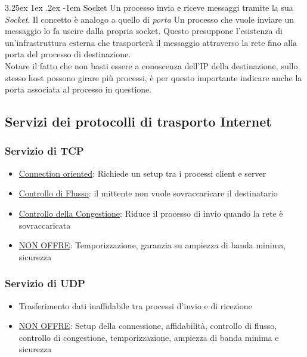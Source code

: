 \documentclass{article}
\makeatletter
\renewcommand\paragraph{\@startsection{paragraph}{5}{\z@}%
  {3.25ex \@plus1ex \@minus.2ex}%
  {-1em}%
  {\normalfont\normalsize\bfseries}}
\makeatother
\begin{document}
            \paragraph{Socket} Un processo invia e riceve messaggi tramite la sua \textit{Socket}. Il concetto è analogo a quello di \textit{porta}
            Un processo che vuole inviare un messaggio lo fa uscire dalla propria socket. Questo presuppone l'esistenza di un'infrastruttura esterna che trasporterà il messaggio attraverso la rete fino alla porta del processo di destinazione.\\
            Notare il fatto che non basti essere a conoscenza dell'IP della destinazione, sullo stesso host possono girare più processi, è per questo importante indicare anche la porta associata al processo in questione.

        \subsection{Servizi dei protocolli di trasporto Internet}
            \subsubsection{Servizio di TCP}
                \begin{itemize}
                    \item \underline{Connection oriented}: Richiede un setup tra i processi client e server
                    \item \underline{Controllo di Flusso}: il mittente non vuole sovraccaricare il destinatario
                    \item \underline{Controllo della Congestione}: Riduce il processo di invio quando la rete è sovraccaricata
                    \item \underline{NON OFFRE}: Temporizzazione, garanzia su ampiezza di banda minima, sicurezza 
                \end{itemize}

            \subsubsection{Servizio di UDP}
                \begin{itemize}
                    \item Trasferimento dati inaffidabile tra processi d'invio e di ricezione
                    \item \underline{NON OFFRE}: Setup della connessione, affidabilità, controllo di flusso, controllo di congestione, temporizzazione, ampiezza di banda minima e sicurezza
                \end{itemize}
\end{document}

